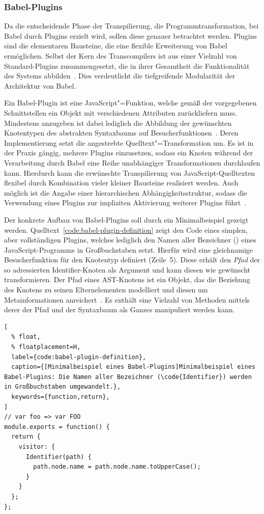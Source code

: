 \subsubsection{Babel-Plugins}
\label{sec:babel-plugins}

Da die entscheidende Phase der Transpilierung, die Programmtransformation, bei Babel durch Plugins erzielt wird, sollen diese genauer betrachtet werden. Plugins sind die elementaren Bausteine, die eine flexible Erweiterung von Babel ermöglichen. Selbst der Kern des Transcompilers ist aus einer Vielzahl von Standard-Plugins zusammengesetzt, die in ihrer Gesamtheit die Funktionalität des Systems abbilden~\autocite{BABEL}. Dies verdeutlicht die tiefgreifende Modularität der Architektur von Babel.

Ein Babel-Plugin ist eine JavaScript"=Funktion, welche gemäß der vorgegebenen Schnittstellen ein Objekt mit verschiedenen Attributen zurückliefern muss. Mindestens anzugeben ist dabei lediglich die Abbildung der gewünschten Knotentypen des abstrakten Syntaxbaums auf Besucherfunktionen~\autocite{BABEL:HANDBOOK}. Deren Implementierung setzt die angestrebte Quelltext"=Transformation um. Es ist in der Praxis gängig, mehrere Plugins einzusetzen, sodass ein Knoten während der Verarbeitung durch Babel eine Reihe unabhängiger Transformationen durchlaufen kann. Hierdurch kann die erwünschte Transpilierung von JavaScript-Quelltexten flexibel durch Kombination vieler kleiner Bausteine realisiert werden. Auch möglich ist die Angabe einer hierarchischen Abhängigkeitsstruktur, sodass die Verwendung eines Plugins zur impliziten Aktivierung weiterer Plugins führt~\autocite{BABEL:HANDBOOK}.

Der konkrete Aufbau von Babel-Plugins soll durch ein Minimalbeispiel gezeigt werden. Quelltext~\ref{code:babel-plugin-definition} zeigt den Code eines simplen, aber vollständigen Plugins, welches lediglich den Namen aller Bezeichner () eines JavaScript-Programms in Großbuchstaben setzt. Hierfür wird eine gleichnamige Besucherfunktion für den Knotentyp  definiert (Zeile~5). Diese erhält den \emph{Pfad} der so adressierten Identifier-Knoten als Argument und kann diesen wie gewünscht transformieren. Der Pfad eines AST-Knotens ist ein Objekt, das die Beziehung des Knotens zu seinen Elternelementen modelliert und diesen um Metainformationen anreichert~\autocite{BABEL:HANDBOOK}. Es enthält eine Vielzahl von Methoden mittels derer der Pfad und der Syntaxbaum als Ganzes manipuliert werden kann.

\begin{lstlisting}[
  % float,
  % floatplacement=H,
  label={code:babel-plugin-definition},
  caption={[Minimalbeispiel eines Babel-Plugins]Minimalbeispiel eines Babel-Plugins: Die Namen aller Bezeichner (\code{Identifier}) werden in Großbuchstaben umgewandelt.},
  keywords={function,return},
]
// var foo => var FOO
module.exports = function() {
  return {
    visitor: {
      Identifier(path) {
        path.node.name = path.node.name.toUpperCase();
      }
    }
  };
};
\end{lstlisting}

